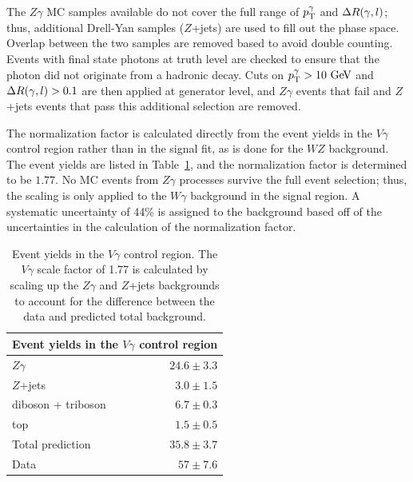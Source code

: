 The $Z\gamma$ MC samples available do not cover the full range of $p_{\mathrm{T}}^\gamma$ and $\Delta R(\gamma,l)$; thus, additional Drell-Yan samples ($Z$+jets) are used to fill out the phase space.
Overlap between the two samples are removed based to avoid double counting.
Events with final state photons at truth level are checked to ensure that the photon did not originate from a hadronic decay.
Cuts on $\pt^\gamma > 10\gev$ and $\Delta R(\gamma,l) > 0.1$ are then applied at generator level, and $Z\gamma$ events that fail and $Z$+jets events that pass this additional selection are removed.

The normalization factor is calculated directly from the event yields in the $V\gamma$ control region rather than in the signal fit, as is done for the $WZ$ background.
The event yields are listed in Table~\ref{tab:ssww13tev_vgamma_numbers}, and the normalization factor is determined to be $1.77$.
No MC events from $Z\gamma$ processes survive the full event selection; thus, the scaling is only applied to the $W\gamma$ background in the signal region.
A systematic uncertainty of 44\% is assigned to the background based off of the uncertainties in the calculation of the normalization factor.

\begin{table}[htbp]
  \centering
  \begin{tabular}{l r}
    \multicolumn{2}{c}{Event yields in the $V\gamma$ control region} \\
    \hline\hline
    $Z\gamma$ & $24.6\pm 3.3$ \\
    $Z$+jets  &  $3.0\pm 1.5$ \\
    diboson + triboson & $6.7\pm 0.3$ \\
    top       &  $1.5\pm 0.5$ \\
    \hline
    Total prediction & $35.8\pm 3.7$ \\
    Data             & $57 \pm 7.6$ \\
    \hline
  \end{tabular}
  \caption{Event yields in the $V\gamma$ control region.  The $V\gamma$ scale factor of 1.77 is calculated by scaling up the $Z\gamma$ and $Z$+jets backgrounds to account for the difference between the data and predicted total background.}
  \label{tab:ssww13tev_vgamma_numbers}
\end{table}

